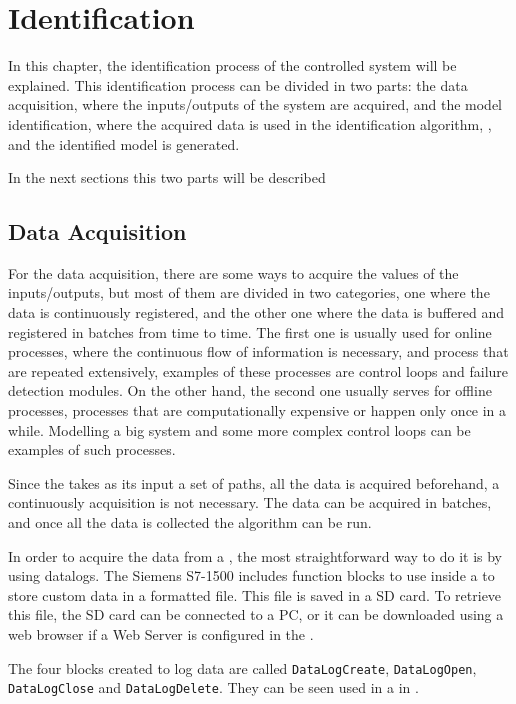 
\chapter{Identification}
\label{cha:ident}
In this chapter, the identification process of the controlled system will be
explained. This identification process can be divided in two parts: the data acquisition, where the inputs\slash outputs of the system are
  acquired, and the model identification, where the acquired data is
  used in the identification algorithm, , and the
  identified model is generated.
  
In the next sections this two parts will be described

\section{Data Acquisition}
For the data acquisition, there are some ways to acquire the values of the
inputs\slash outputs, but most of them are divided in two categories, one where
the data is continuously registered, and the other one where the data is buffered
and registered in batches from time to time.
The first one is usually used for online processes, where the continuous flow of
information is necessary, and process that are repeated
extensively, examples of these processes are control loops and failure
detection modules. On the other hand, the second one usually serves for offline
processes, processes that are computationally expensive or happen only once in a
while. Modelling a big system and some more complex control loops can be examples of
such processes. 

Since the
 takes as its input a set of paths, all the data is
acquired beforehand, a continuously acquisition is not necessary. The data can
be acquired in batches, and once all the data is collected the algorithm can be
run.

In order to acquire the data from a \PLC{}, the most straightforward way to do
it is by using datalogs. The Siemens \PLC{} S7-1500 includes function blocks to
use inside a \LD{} to store custom data in a \CSV{} formatted file. This file is
saved in a SD card. To retrieve this file, the SD card can be connected to a PC,
or it can be downloaded using a web browser if a Web Server is configured in the
\PLC.

The four blocks created to log data are called
\verb|DataLogCreate|,
\verb|DataLogOpen|, \verb|DataLogClose| and \verb|DataLogDelete|.
They can be seen used in a \LD{} in .

